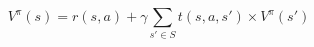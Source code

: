 \documentclass[preview,30pt]{standalone}
\begin{document}
$$
V^\pi(s)= r(s, a) + \gamma \sum_{s'\in S} t(s,a,s') \times V^\pi(s')
$$
\end{document}
